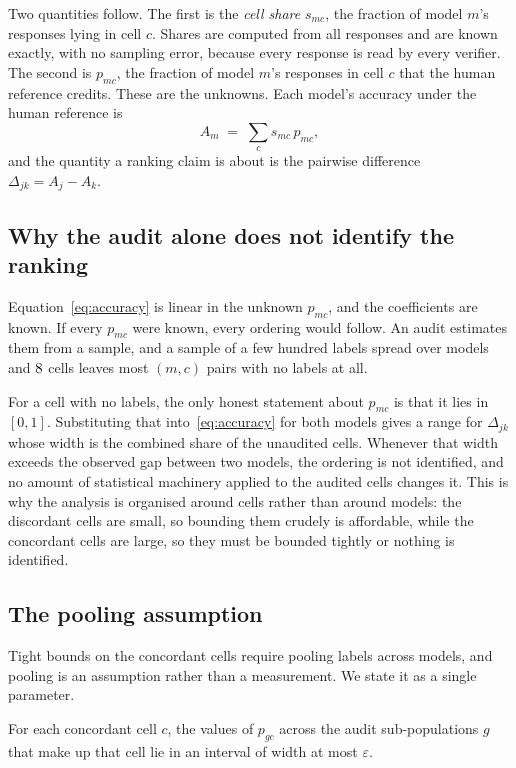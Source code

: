 Two quantities follow. The first is the \emph{cell share} $s_{mc}$, the fraction of model
$m$'s responses lying in cell $c$. Shares are computed from all \NumRows{} responses and are
known exactly, with no sampling error, because every response is read by every verifier. The
second is $p_{mc}$, the fraction of model $m$'s responses in cell $c$ that the human reference
credits. These are the unknowns. Each model's accuracy under the human reference is
\begin{equation}
A_m \;=\; \sum_{c} s_{mc}\, p_{mc},
\label{eq:accuracy}
\end{equation}
and the quantity a ranking claim is about is the pairwise difference
$\Delta_{jk} = A_j - A_k$.

\subsection{Why the audit alone does not identify the ranking}

Equation~\eqref{eq:accuracy} is linear in the unknown $p_{mc}$, and the coefficients are
known. If every $p_{mc}$ were known, every ordering would follow. An audit estimates them
from a sample, and a sample of a few hundred labels spread over \NumModels{} models and
$8$ cells leaves most $(m,c)$ pairs with no labels at all.

For a cell with no labels, the only honest statement about $p_{mc}$ is that it lies in
$[0,1]$. Substituting that into~\eqref{eq:accuracy} for both models gives a range for
$\Delta_{jk}$ whose width is the combined share of the unaudited cells. Whenever that width
exceeds the observed gap between two models, the ordering is not identified, and no amount of
statistical machinery applied to the audited cells changes it. This is why the analysis is
organised around cells rather than around models: the discordant cells are small, so bounding
them crudely is affordable, while the concordant cells are large, so they must be bounded
tightly or nothing is identified.

\subsection{The pooling assumption}

Tight bounds on the concordant cells require pooling labels across models, and pooling is an
assumption rather than a measurement. We state it as a single parameter.

\begin{assumption}
\label{ass:h}
For each concordant cell $c$, the values of $p_{gc}$ across the audit sub-populations $g$ that
make up that cell lie in an interval of width at most $\varepsilon$.
\end{assumption}

